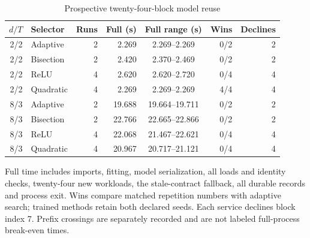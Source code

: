 \begin{table}[htbp]
\centering
\caption{Prospective twenty-four-block model reuse}\label{tab:reuse67}
{\small\setlength{\tabcolsep}{4pt}
\begin{tabular}{rlrrcrr}
\toprule
$d/T$ & Selector & Runs & Full (s) & Full range (s) & Wins & Declines \\
\midrule
2/2 & Adaptive & 2 & 2.269 & 2.269--2.269 & 0/2 & 2 \\
2/2 & Bisection & 2 & 2.420 & 2.370--2.469 & 0/2 & 2 \\
2/2 & ReLU & 4 & 2.620 & 2.620--2.720 & 0/4 & 4 \\
2/2 & Quadratic & 4 & 2.269 & 2.269--2.269 & 4/4 & 4 \\
8/3 & Adaptive & 2 & 19.688 & 19.664--19.711 & 0/2 & 2 \\
8/3 & Bisection & 2 & 22.766 & 22.665--22.866 & 0/2 & 2 \\
8/3 & ReLU & 4 & 22.068 & 21.467--22.621 & 0/4 & 4 \\
8/3 & Quadratic & 4 & 20.967 & 20.717--21.121 & 0/4 & 4 \\
\bottomrule
\end{tabular}}
\par\smallskip
{\footnotesize Full time includes imports, fitting, model serialization, all loads and identity checks, twenty-four new workloads, the stale-contract fallback, all durable records and process exit. Wins compare matched repetition numbers with adaptive search; trained methods retain both declared seeds. Each service declines block index 7. Prefix crossings are separately recorded and are not labeled full-process break-even times.}
\end{table}
